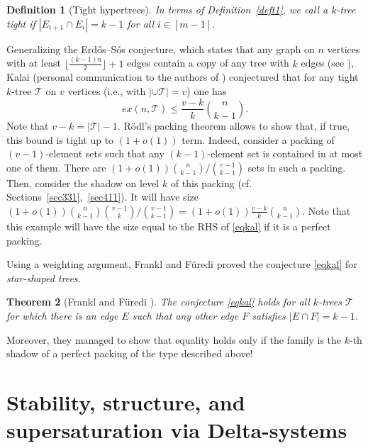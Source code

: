 \documentclass[graybox]{svmult}
\renewcommand{\le}{\leqslant}
\newcommand{\m}{\mathcal}
\newtheorem{thm}{Theorem}
\newtheorem{defn}[thm]{Definition}
\begin{document}
\begin{defn}[Tight hypertrees]\label{deft2} In terms of Definition~\ref{deft1}, we call a $k$-tree {\em tight} if $|E_{i+1}\cap E_i| = k-1$ for all $i\in [m-1]$.
\end{defn}

Generalizing the  Erd\H os--S\'os conjecture, which states that any graph on $n$ vertices with at least $\big\lfloor\frac{(k-1)n}2\big\rfloor+1$ edges contain a copy of any tree with $k$ edges (see \cite[page 2]{Erd64}), Kalai (personal communication to the authors of \cite{FF2}) conjectured that for any tight $k$-tree $\m T$ on $v$ vertices (i.e., with $|\cup \m T| = v$) one has
\begin{equation}\label{eqkal} ex(n, \m T)\le \frac {v-k}k {n\choose k-1}.\end{equation}
Note that $v-k = |\m T|-1$. R\"odl's packing theorem \cite{Ro} allows to show that, if true, this bound is tight up to $(1+o(1))$ term. Indeed, consider a packing of $(v-1)$-element sets such that any $(k-1)$-element set is contained in at most one of them. There are $(1+o(1)){n\choose k-1}/{v-1\choose k-1}$ sets in such a packing. Then, consider the shadow on level $k$ of this packing (cf. Sections~\ref{sec331},~\ref{sec411}). It will have size $(1+o(1)){n\choose k-1}{v-1\choose k}/{v-1\choose k-1}=(1+o(1))\frac{v-k}k{n\choose k-1}$.  Note that this example will have the size equal to the RHS of \eqref{eqkal} if it is a perfect packing.

Using a weighting argument, Frankl and F\"uredi proved the conjecture \eqref{eqkal} for {\it star-shaped trees}.
\begin{thm}[Frankl and F\"uredi \cite{FF2}]
  The conjecture \eqref{eqkal} holds for all $k$-trees $\mathcal T$ for which there is an edge $E$ such that any other edge $F$ satisfies $|E\cap F|=k-1$.
\end{thm}
Moreover, they managed to show that equality holds only if the family is the $k$-th shadow of a perfect packing of the type described above!

\section{Stability, structure, and supersaturation via Delta-systems}\label{sec6}
\end{document}
